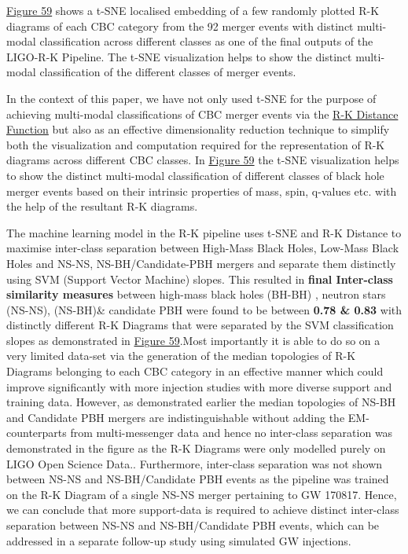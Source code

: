 \hyperref[fig:ligo_tsne]{Figure 59} shows a t-SNE localised embedding of a few randomly plotted R-K diagrams of each CBC category from the 92 merger events with distinct multi-modal classification across different classes as one of the final outputs of the LIGO-R-K Pipeline. The t-SNE visualization helps to show the distinct multi-modal classification of the different classes of merger events.

In the context of this paper, we have not only used t-SNE for the purpose of achieving multi-modal classifications of CBC merger events via the \hyperref[sec:rk_distance]{R-K Distance Function} but also as an effective dimensionality reduction technique to simplify both the visualization and computation required for the representation of R-K diagrams across different CBC classes. In \hyperref[fig:ligo_tsne]{Figure 59} the t-SNE visualization helps to show the distinct multi-modal classification of different classes of black hole merger events based on their intrinsic properties of mass, spin, q-values etc. with the help of the resultant R-K diagrams. 

The machine learning model in the R-K pipeline uses t-SNE and 
 R-K Distance to maximise inter-class separation between High-Mass Black Holes, Low-Mass Black Holes and NS-NS, NS-BH/Candidate-PBH mergers and separate them distinctly using SVM (Support Vector Machine) slopes.\cite{25.8_1995SVMSlopes} This resulted in  \textbf{final Inter-class similarity measures} between high-mass black holes (BH-BH) , neutron stars (NS-NS), (NS-BH)\& candidate PBH were found to be between \textbf{0.78 \& 0.83} with distinctly different R-K Diagrams that were separated by the SVM classification slopes as demonstrated in \hyperref[fig:ligo_tsne]{Figure 59}.Most importantly it is able to do so on a very limited data-set via the generation of the median topologies of R-K Diagrams belonging to each CBC category in an effective manner which could improve significantly with more injection studies with more diverse support and training data. However, as demonstrated earlier the median topologies of NS-BH and Candidate PBH mergers are indistinguishable without adding the EM-counterparts from multi-messenger data and hence no inter-class separation was demonstrated in the figure as the R-K Diagrams were only modelled purely on LIGO Open Science Data.\cite{00_LIGOOpenSciData}. Furthermore, inter-class separation was not shown between NS-NS and NS-BH/Candidate PBH events as the pipeline was trained on the R-K Diagram of a single NS-NS merger pertaining to GW 170817. Hence, we can conclude that more support-data is required to achieve distinct inter-class separation between NS-NS and NS-BH/Candidate PBH events, which can be addressed in a separate follow-up study using simulated GW injections.

